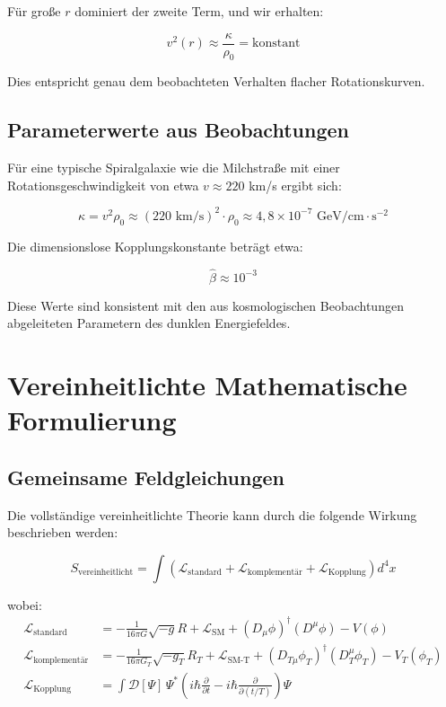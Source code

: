 \documentclass[a4paper,12pt]{article}
\theoremstyle{definition}
\theoremstyle{remark}
\begin{document}
	Für große $r$ dominiert der zweite Term, und wir erhalten:
	
	\begin{equation}
		v^2(r) \approx \frac{\kappa}{\rho_0} = \text{konstant}
	\end{equation}
	
	Dies entspricht genau dem beobachteten Verhalten flacher Rotationskurven.
	
	\subsection{Parameterwerte aus Beobachtungen}
	
	Für eine typische Spiralgalaxie wie die Milchstraße mit einer Rotationsgeschwindigkeit von etwa $v \approx 220$ km/s ergibt sich:
	
	\begin{equation}
		\kappa = v^2 \rho_0 \approx (220 \text{ km/s})^2 \cdot \rho_0 \approx 4{,}8 \times 10^{-7} \text{ GeV/cm} \cdot \text{s}^{-2}
	\end{equation}
	
	Die dimensionslose Kopplungskonstante beträgt etwa:
	
	\begin{equation}
		\hat{\beta} \approx 10^{-3}
	\end{equation}
	
	Diese Werte sind konsistent mit den aus kosmologischen Beobachtungen abgeleiteten Parametern des dunklen Energiefeldes.
	
	\section{Vereinheitlichte Mathematische Formulierung}
	
	\subsection{Gemeinsame Feldgleichungen}
	
	Die vollständige vereinheitlichte Theorie kann durch die folgende Wirkung beschrieben werden:
	
	\begin{equation}
		S_\text{vereinheitlicht} = \int \left( \mathcal{L}_\text{standard} + \mathcal{L}_\text{komplementär} + \mathcal{L}_\text{Kopplung} \right) d^4x
	\end{equation}
	
	wobei:
	\begin{align}
		\mathcal{L}_\text{standard} &= -\frac{1}{16\pi G} \sqrt{-g} R + \mathcal{L}_\text{SM} + (D_\mu \phi)^\dagger (D^\mu \phi) - V(\phi) \\
		\mathcal{L}_\text{komplementär} &= -\frac{1}{16\pi G_T} \sqrt{-g_T} R_T + \mathcal{L}_\text{SM-T} + (D_{T\mu} \phi_T)^\dagger (D_T^\mu \phi_T) - V_T(\phi_T) \\
		\mathcal{L}_\text{Kopplung} &= \int \mathcal{D}[\Psi] \, \Psi^* \left( i\hbar \frac{\partial}{\partial t} - i\hbar \frac{\partial}{\partial (t/T)} \right) \Psi
	\end{align}
	
\end{document}
